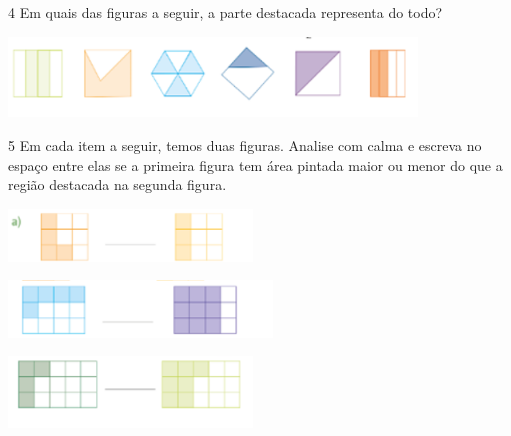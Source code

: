 \begin{mdframed}[linewidth=2pt,linecolor=salmao,roundcorner=2pt]
\begin{escolha}
{\num{4} Em quais das figuras a seguir, a parte destacada representa  do todo?

\includegraphics[width=4.27537in,height=0.84174in]{media/image107.png}



\num{5} Em cada item a seguir, temos duas figuras. Analise com calma e escreva no espaço
entre elas se a primeira figura tem área pintada maior ou menor do que a
região destacada na segunda figura.


\begin{escolha}
\item\includegraphics[width=2.55022in,height=0.55005in]{media/image108.png}

\item\includegraphics[width=2.75857in,height=0.60005in]{media/image109.png}

\item\includegraphics[width=2.55022in,height=0.75006in]{media/image110.png}
\end{escolha}

}
\end{escolha}
\end{mdframed}
